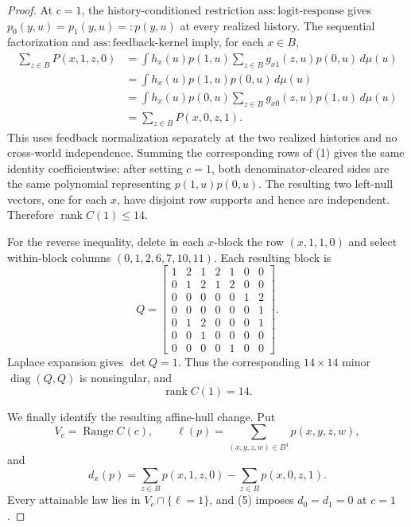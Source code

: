 \documentclass{article}
\begin{document}
\begin{proof}
At \(c=1\), the history-conditioned restriction \(\mathrm{ass{:}logit\text{-}response}\) gives \(p_0(y,u)=p_1(y,u)=:p(y,u)\) at every realized history.  The sequential factorization and \(\mathrm{ass{:}feedback\text{-}kernel}\) imply, for each \(x\in B\),
\[
\begin{aligned}
 \sum_{z\in B}P(x,1,z,0)
 &=\int h_x(u)p(1,u)
      \sum_{z\in B}g_{x1}(z,u)p(0,u)\,d\mu(u)\\
 &=\int h_x(u)p(1,u)p(0,u)\,d\mu(u)\\
 &=\int h_x(u)p(0,u)
      \sum_{z\in B}g_{x0}(z,u)p(1,u)\,d\mu(u)\\
 &=\sum_{z\in B}P(x,0,z,1).
\end{aligned} \tag{5}
\]
This uses feedback normalization separately at the two realized histories and no cross-world independence.  Summing the corresponding rows of (1) gives the same identity coefficientwise: after setting \(c=1\), both denominator-cleared sides are the same polynomial representing \(p(1,u)p(0,u)\).  The resulting two left-null vectors, one for each \(x\), have disjoint row supports and hence are independent.  Therefore \(\operatorname{rank}C(1)\le14\).

For the reverse inequality, delete in each \(x\)-block the row \((x,1,1,0)\) and select within-block columns \((0,1,2,6,7,10,11)\).  Each resulting block is
\[
 Q=\begin{bmatrix}
1&2&1&2&1&0&0\\
0&1&2&1&2&0&0\\
0&0&0&0&0&1&2\\
0&0&0&0&0&0&1\\
0&1&2&0&0&0&1\\
0&0&1&0&0&0&0\\
0&0&0&0&1&0&0
\end{bmatrix}. \tag{6}
\]
Laplace expansion gives \(\det Q=1\).  Thus the corresponding \(14\times14\) minor \(\operatorname{diag}(Q,Q)\) is nonsingular, and
\[
 \operatorname{rank}C(1)=14. \tag{7}
\]

We finally identify the resulting affine-hull change.  Put
\[
 V_c=\operatorname{Range}C(c),
 \qquad
 \ell(p)=\sum_{(x,y,z,w)\in B^4}p(x,y,z,w),
\]
and
\[
 d_x(p)=\sum_{z\in B}p(x,1,z,0)-\sum_{z\in B}p(x,0,z,1). \tag{8}
\]
Every attainable law lies in \(V_c\cap\{\ell=1\}\), and (5) imposes \(d_0=d_1=0\) at \(c=1\).


\end{proof}
\end{document}
